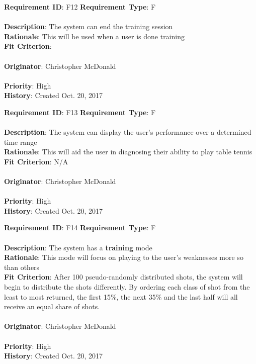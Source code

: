 \documentclass[11pt]{article}
\begin{document}
\begin{framed}
	\noindent\textbf{Requirement ID}: F12 \hfill \textbf{Requirement Type}: F \hfill\\\\
	\noindent\textbf{Description}: The system can end the training session \\
	\textbf{Rationale}: This will be used when a user is done training \\
	\textbf{Fit Criterion}: \\\\
	\textbf{Originator}: Christopher McDonald \\\\
	\textbf{Priority}: High \hfill \\
	\noindent\textbf{History}: Created Oct. 20, 2017
\end{framed}

\begin{framed}
	\noindent\textbf{Requirement ID}: F13 \hfill \textbf{Requirement Type}: F \hfill\\\\
	\noindent\textbf{Description}: The system can display the user's performance over a determined time range \\
	\textbf{Rationale}: This will aid the user in diagnosing their ability to play table tennis \\
	\textbf{Fit Criterion}: N/A\\\\
	\textbf{Originator}: Christopher McDonald \\\\
	\textbf{Priority}: High \hfill \\
	\noindent\textbf{History}: Created Oct. 20, 2017
\end{framed}

\begin{framed}
	\noindent\textbf{Requirement ID}: F14 \hfill \textbf{Requirement Type}: F \hfill\\\\
	\noindent\textbf{Description}: The system has a \textbf{training} mode \\
	\textbf{Rationale}: This mode will focus on playing to the user's weaknesses more so than others \\
	\textbf{Fit Criterion}: After 100 pseudo-randomly distributed shots, the system will begin to distribute the shots differently. By ordering each class of shot from the least to most returned, the first 15\%, the next 35\% and the last half will all receive an equal share of shots. \\\\
	\textbf{Originator}: Christopher McDonald \\\\
	\textbf{Priority}: High \hfill \\
	\noindent\textbf{History}: Created Oct. 20, 2017
\end{framed}
\end{document}
